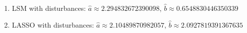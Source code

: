 \begin{enumerate}
\item LSM with disturbances:
$\hat{a}\approx 2.294832672390098$, $\hat{b}\approx 0.6548830446350339$
\item LASSO with disturbances:
$\hat{a}\approx 2.10489870982057$, $\hat{b}\approx 2.0927819391367635$
\end{enumerate}
